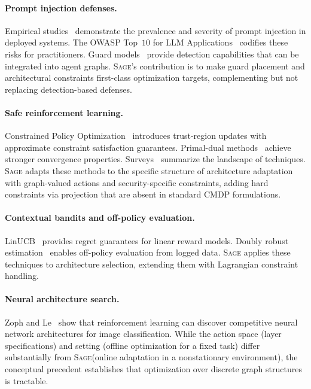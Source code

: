 \documentclass[sigconf,anonymous]{acmart}
\newcommand{\SAGE}{\textsc{Sage}\xspace}
\begin{document}
\paragraph{Prompt injection defenses.} Empirical studies~\cite{liu2024promptinjection,greshake2023indirect} demonstrate the prevalence and severity of prompt injection in deployed systems. The OWASP Top~$10$ for LLM Applications~\cite{owasp2023llmtop10} codifies these risks for practitioners. Guard models~\cite{li2024piguard,injecguard2024} provide detection capabilities that can be integrated into agent graphs. \SAGE's contribution is to make guard placement and architectural constraints first-class optimization targets, complementing but not replacing detection-based defenses.

\paragraph{Safe reinforcement learning.} Constrained Policy Optimization~\cite{achiam2017cpo} introduces trust-region updates with approximate constraint satisfaction guarantees. Primal-dual methods~\cite{ding2024lastiterateconvergence} achieve stronger convergence properties. Surveys~\cite{kushwaha2024saferl,zhao2023saferlsurvey} summarize the landscape of techniques. \SAGE adapts these methods to the specific structure of architecture adaptation with graph-valued actions and security-specific constraints, adding hard constraints via projection that are absent in standard CMDP formulations.

\paragraph{Contextual bandits and off-policy evaluation.} LinUCB~\cite{li2010contextualbandit,chu2011contextual} provides regret guarantees for linear reward models. Doubly robust estimation~\cite{jiang2016doublyrobust} enables off-policy evaluation from logged data. \SAGE applies these techniques to architecture selection, extending them with Lagrangian constraint handling.

\paragraph{Neural architecture search.} Zoph and Le~\cite{zoph2017nas} show that reinforcement learning can discover competitive neural network architectures for image classification. While the action space (layer specifications) and setting (offline optimization for a fixed task) differ substantially from \SAGE (online adaptation in a nonstationary environment), the conceptual precedent establishes that optimization over discrete graph structures is tractable.
\end{document}
